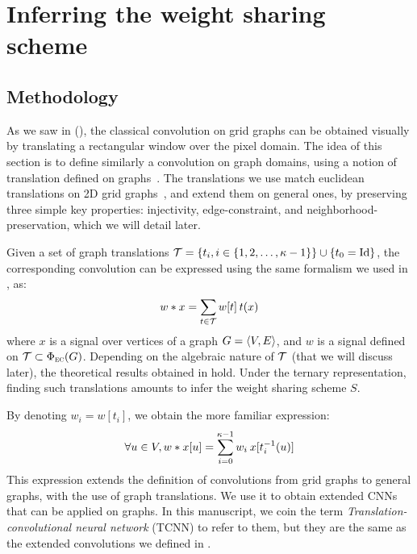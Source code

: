 \section{Inferring the weight sharing scheme}
\label{sec:trans}

\subsection{Methodology}

As we saw in  (), the classical convolution on grid graphs can be obtained visually by translating a rectangular window over the pixel domain. The idea of this section is to define similarly a convolution on graph domains, using a notion of translation defined on graphs~\citep{pasdeloup2017translations}. The translations we use match euclidean translations on 2D grid graphs~\citep{GrePasViaGri201610}, and extend them on general ones, by preserving three simple key properties: injectivity, edge-constraint, and neighborhood-preservation, which we will detail later.

Given a set of graph translations $\ct = \{t_i, i \in \seq{\kappa - 1}\} \cup \{t_0 = \id \}$, the corresponding convolution can be expressed using the same formalism we used in , as:
\begin{gather}
w \ast x = \displaystyle\sum_{t \in \ct} w[t] \h{2} t(x)
\end{gather}
where $x$ is a signal over vertices of a graph $\gve$, and $w$ is a signal defined on $\ct \subset \Phi_{\EC}(G)$. Depending on the algebraic nature of $\ct$ (that we will discuss later), the theoretical results obtained in  hold. Under the ternary representation, finding such translations amounts to infer the weight sharing scheme $S$.

By denoting $w_i = w[t_i]$, we obtain the more familiar expression:
\begin{gather}
\forall u \in V, w \ast x [u] = \displaystyle\sum_{i=0}^{\kappa-1} w_i \h{2} x[t_i^{-1}(u)]
\end{gather}
This expression extends the definition of convolutions from grid graphs to general graphs, with the use of graph translations. We use it to obtain extended CNNs that can be applied on graphs. In this manuscript, we coin the term \emph{Translation-convolutional neural network} (TCNN) to refer to them, but they are the same as the extended convolutions we defined in \cite{pasdeloup2017convolutional}.

